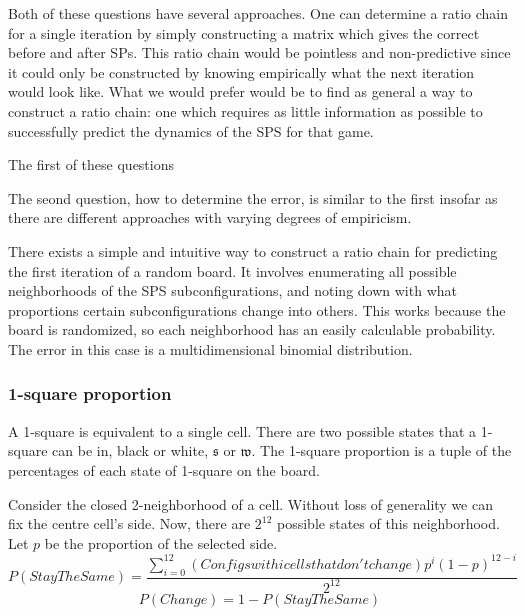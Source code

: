 \documentclass[12pt]{article}
\theoremstyle{definition}
\theoremstyle{remark}
\theoremstyle{remark}
\begin{document}
\par
Both of these questions have several approaches. One can determine a ratio chain for a single iteration by simply constructing a matrix which gives the correct before and after SPs. This ratio chain would be pointless and non-predictive since it could only be constructed by knowing empirically what the next iteration would look like. What we would prefer would be to find as general a way to construct a ratio chain: one which requires as little information as possible to successfully predict the dynamics of the SPS for that game.
\par
The first of these questions  %
\par
The seond question, how to determine the error, is similar to the first insofar as there are different approaches with varying degrees of empiricism. 



\par
There exists a simple and intuitive way to construct a ratio chain for predicting the first iteration of a random board. It involves enumerating all possible neighborhoods of the SPS subconfigurations, and noting down with what proportions certain subconfigurations change into others. This works because the board is randomized, so each neighborhood has an easily calculable probability. The error in this case is a multidimensional binomial distribution. %

\subsubsection{1-square proportion}
\par
A 1-square is equivalent to a single cell. There are two possible states that a 1-square can be in, black or white, $\mathfrak{s}$ or $\mathfrak{w}$. The 1-square proportion is a tuple of the percentages of each state of 1-square on the board.
\par
Consider the closed 2-neighborhood of a cell. Without loss of generality we can fix the centre cell's side. Now, there are $2^{12}$ possible states of this neighborhood. Let $p$ be the proportion of the selected side.
\begin{equation}
P(Stay The Same)=\frac{\sum^{12}_{i=0}{\left(Configs with i cells that don't change\right)p^i \left(1-p\right)^{12-i}}}{2^{12}}
\end{equation}
\begin{equation}
P(Change)=1-P(Stay The Same)
\end{equation}
\end{document}
